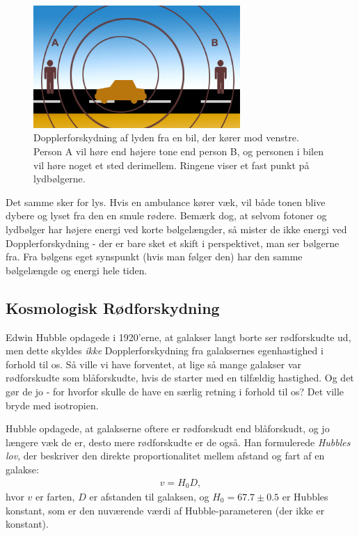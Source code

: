 \begin{figure}[h!]
	\centering
	\includegraphics[width=0.7\textwidth]{Astrofysik/Astrofig/doppler.jpg}
	\caption{Dopplerforskydning af lyden fra en bil, der kører mod venstre. Person A vil høre end højere tone end person B, og personen i bilen vil høre noget et sted derimellem. Ringene viser et fast punkt på lydbølgerne.}
	\label{shapes}
\end{figure}

Det samme sker for lys. Hvis en ambulance kører væk, vil både tonen blive dybere og lyset fra den en smule rødere. Bemærk dog, at selvom fotoner og lydbølger har højere energi ved korte bølgelængder, så mister de ikke energi ved Dopplerforskydning - der er bare sket et skift i perspektivet, man ser bølgerne fra. Fra bølgens eget synspunkt (hvis man følger den) har den samme bølgelængde og energi hele tiden.
\subsection{Kosmologisk Rødforskydning}
Edwin Hubble opdagede i 1920'erne, at galakser langt borte ser rødforskudte ud, men dette skyldes \emph{ikke} Dopplerforskydning fra galaksernes egenhastighed i forhold til os. Så ville vi have forventet, at lige så mange galakser var rødforskudte som blåforskudte, hvis de starter med en tilfældig hastighed. Og det gør de jo - for hvorfor skulle de have en særlig retning i forhold til os? Det ville bryde med isotropien. 

Hubble opdagede, at galakserne oftere er rødforskudt end blåforskudt, og jo længere væk de er, desto mere rødforskudte er de også. Han formulerede \emph{Hubbles lov}, der beskriver den direkte proportionalitet mellem afstand og fart af en galakse:
\begin{align}
v=H_0 D, \label{Hubbleslaw}
\end{align}
hvor $v$ er farten, $D$ er afstanden til galaksen, og $H_0=67.7\pm0.5$ er Hubbles konstant, som er den nuværende værdi af Hubble-parameteren (der ikke er konstant).

